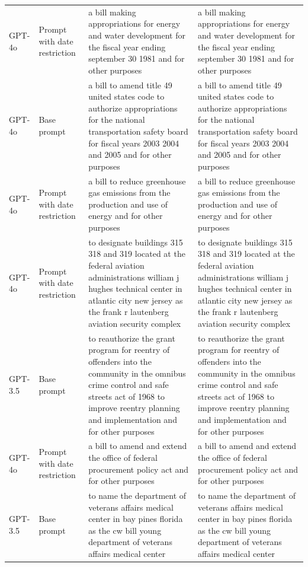 \begin{longtable}{>{\raggedright\arraybackslash}p{1.4cm}>{\raggedright\arraybackslash}p{1.4cm}>{\raggedright\arraybackslash}p{5.5cm}>{\raggedright\arraybackslash}p{5.5cm}}
GPT-4o & Prompt with date restriction & a bill making appropriations for energy and water development for the fiscal year ending september 30 1981 and for other purposes & a bill making appropriations for energy and water development for the fiscal year ending september 30 1981 and for other purposes\\
GPT-4o & Base prompt & a bill to amend title 49 united states code to authorize appropriations for the national transportation safety board for fiscal years 2003 2004 and 2005 and for other purposes & a bill to amend title 49 united states code to authorize appropriations for the national transportation safety board for fiscal years 2003 2004 and 2005 and for other purposes\\
GPT-4o & Prompt with date restriction & a bill to reduce greenhouse gas emissions from the production and use of energy and for other purposes & a bill to reduce greenhouse gas emissions from the production and use of energy and for other purposes\\
GPT-4o & Prompt with date restriction & to designate buildings 315 318 and 319 located at the federal aviation administrations william j hughes technical center in atlantic city new jersey as the frank r lautenberg aviation security complex & to designate buildings 315 318 and 319 located at the federal aviation administrations william j hughes technical center in atlantic city new jersey as the frank r lautenberg aviation security complex\\
GPT-3.5 & Base prompt & to reauthorize the grant program for reentry of offenders into the community in the omnibus crime control and safe streets act of 1968 to improve reentry planning and implementation and for other purposes & to reauthorize the grant program for reentry of offenders into the community in the omnibus crime control and safe streets act of 1968 to improve reentry planning and implementation and for other purposes\\
GPT-4o & Prompt with date restriction & a bill to amend and extend the office of federal procurement policy act and for other purposes & a bill to amend and extend the office of federal procurement policy act and for other purposes\\
GPT-3.5 & Base prompt & to name the department of veterans affairs medical center in bay pines florida as the cw bill young department of veterans affairs medical center & to name the department of veterans affairs medical center in bay pines florida as the cw bill young department of veterans affairs medical center\\

\end{longtable}
